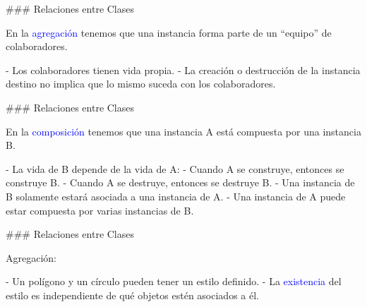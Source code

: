### Relaciones entre Clases


\vspace{-1em}
\columnsbegin


En la \textcolor{blue}{agregación} tenemos que una instancia forma parte
de un ``equipo'' de colaboradores.

- Los colaboradores tienen vida propia.
- La creación o destrucción de la instancia destino no implica que lo mismo
suceda con los colaboradores.


\centering{}

\columnsend

### Relaciones entre Clases


\vspace{-1em}
\columnsbegin


En la \textcolor{blue}{composición} tenemos que una instancia A está compuesta por una
instancia B.

- La vida de B depende de la vida de A:
    - Cuando A se construye, entonces se construye B.
    - Cuando A se destruye, entonces se destruye B.
    - Una instancia de B solamente estará asociada a una instancia de A.
    - Una instancia de A puede estar compuesta por varias instancias de B.


\centering{}

\columnsend

### Relaciones entre Clases



\usebox{\umlAgregComp}\par

Agregación:

- Un polígono y un círculo pueden tener un estilo definido.
- La \textcolor{blue}{existencia} del estilo es independiente de
qué objetos estén asociados a él.

